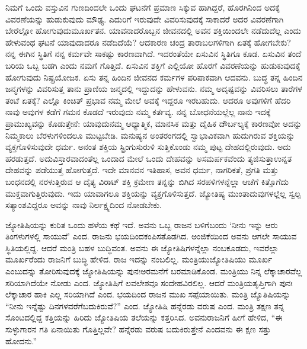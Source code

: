 \vskip 4pt

ನಿಮಗೆ ಒಂದು ವಸ್ತುವಿನ ಗುಣದಿಂದಲೇ ಒಂದು ಘಟನೆಗೆ ಪ್ರಮಾಣ ಸಿಕ್ಕುವ ಹಾಗಿದ್ದರೆ, ಹೊರಗಿನಿಂದ ಅದಕ್ಕೆ ವಿವರಣೆಯನ್ನು ಹುಡುಕುವುದು ಮೌಢ್ಯ. ಎದುರಿಗೆ ಇರುವುದೇ ವಿವರಿಸುವುದಕ್ಕೆ ಸಾಕಾದರೆ ಅದರ ವಿವರಣೆಗಾಗಿ ಬೇರೆಲ್ಲೋ ಹೋಗುವುದು\break ಮೂರ್ಖತನ. ಯಾವನಾದರೊಬ್ಬನ ಜೀವನದಲ್ಲಿ ಅವನ ಶಕ್ತಿಯಿಂದಲೇ ನಡೆದುದೆಲ್ಲ ಎಂದು ಹೇಳುವಂಥ ಘಟನೆ ಯಾವುದಾದರೂ ನಡೆದಿದೆಯೆ? ಆದಕಾರಣ ಚಂದ್ರ ತಾರಾಬಲಗಳಿಗಾಗಿ ಏತಕ್ಕೆ ಹೋಗಬೇಕು? ನನ್ನ ಈಗಿನ ಸ್ಥಿತಿಗೆ ನನ್ನ ಕರ್ಮವೇ ಸಾಕಷ್ಟು ಕಾರಣವಾಗಿದೆ. ಇದರಂತೆಯೇ ಏಸುವಿನ ಸ್ಥಿತಿಗೂ ಕೂಡ. ಏಸುವಿನ ತಂದೆ ಬರಿಯ ಒಬ್ಬ ಬಡಗಿ ಎಂದು ನಮಗೆ ಗೊತ್ತಿದೆ. ಏಸುವಿನ ಶಕ್ತಿಗೆ ಎಲ್ಲಿಯೋ ಹೊರಗೆ ವಿವರಣೆಯನ್ನು ಹುಡುಕುವುದಕ್ಕೆ ಹೋಗುವುದು ನಿಷ್ಪ್ರಯೋಜಕ. ಏಸು ತನ್ನ ಹಿಂದಿನ ಜೀವನದ ಕರ್ಮಗಳ ಪರಿಪಾಕವಾಗಿ ಆದವನು. ಬುದ್ಧ ತನ್ನ ಹಿಂದಿನ ಜನ್ಮಗಳನ್ನು ವಿವರಿಸುತ್ತ ತಾನು ಪ್ರಾಣಿಯ ಜನ್ಮದಲ್ಲಿ ಇದ್ದುದನ್ನು ಹೇಳುವನು. ನಮ್ಮ ಅದೃಷ್ಟವನ್ನು ವಿವರಿಸಲು ತಾರೆಗಳ ತಂಟೆ ಏತಕ್ಕೆ? ಎಲ್ಲೊ ಕಿಂಚಿತ್​ ಪ್ರಭಾವ ನಮ್ಮ ಮೇಲೆ ಅವಕ್ಕೆ ಇದ್ದರೂ ಇರಬಹುದು. ಆದರೂ ಅವುಗಳಿಗೆ ಹೆದರಿ ನಾವು ಅವುಗಳ ಕಡೆಗೆ ಗಮನ ಕೊಡದೆ ಇರುವುದು ನಮ್ಮ ಕರ್ತವ್ಯ. ನನ್ನ ಬೋಧನೆಯಲ್ಲೆಲ್ಲ ನಾನು ಇದಕ್ಕೆ ಪ್ರಾಮುಖ್ಯವನ್ನು ಕೊಡುತ್ತೇನೆ: ಯಾವುದು\break ನಮ್ಮ ಆಧ್ಯಾತ್ಮಿಕ, ಮಾನಸಿಕ ಮತ್ತು ದೈಹಿಕ ದೌರ್ಬಲ್ಯಕ್ಕೆ ಕಾರಣವೋ ಅದನ್ನು ನಿಮ್ಮ\break ಕಾಲು ಬೆರಳುಗಳಿಂದಲೂ ಮುಟ್ಟಬೇಡಿ. ಮನುಷ್ಯನ ಅಂತರಂಗದಲ್ಲಿ ಸ್ವಾಭಾವಿಕವಾಗಿ ಹುದುಗಿರುವ ಶಕ್ತಿಯನ್ನು ವ್ಯಕ್ತಗೊಳಿಸುವುದೇ ಧರ್ಮ. ಅನಂತ ಶಕ್ತಿಯ ಸ್ಪ್ರಿಂಗು\break ಸುರುಳಿ ಸುತ್ತಿಕೊಂಡು ನಮ್ಮ ಪುಟ್ಟ ದೇಹದಲ್ಲಿರುವುದು. ಅದು ಹರಡುತ್ತದೆ. ಅದು\break ವಿಸ್ತಾರವಾದಂತೆಲ್ಲ ಒಂದಾದ ಮೇಲೆ ಒಂದು ದೇಹವನ್ನು ಅಸಮರ್ಪಕವೆಂದು ತ್ಯಜಿಸುತ್ತಾ\break ಉನ್ನತ ದೇಹವನ್ನು ಪಡೆಯುತ್ತ ಹೋಗುತ್ತದೆ. ಇದೇ ಮಾನವನ ಇತಿಹಾಸ, ಅವನ ಧರ್ಮ, ನಾಗರಿಕತೆ, ಪ್ರಗತಿ ಮತ್ತು ಬಂಧನದಲ್ಲಿ ನರಳುತ್ತಿರುವ ಆ ದೈತ್ಯ ವಿರಾಟ್​ ಶಕ್ತಿ ಕ್ರಮೇಣ ತನ್ನನ್ನು ಬಿಗಿದ ಸರಪಳಿಗಳನ್ನೆಲ್ಲಾ ಆಚೆಗೆ ಕಿತ್ತೊಗೆದು ಮುಕ್ತವಾಗುತ್ತಿರುವುದು. ಇದು ಯಾವಾಗಲೂ ಶಕ್ತಿಯನ್ನು ವ್ಯಕ್ತಗೊಳಿಸುತ್ತದೆ. ಜ್ಯೋತಿಷ್ಯ ಮುಂತಾದುವುಗಳಲ್ಲೆಲ್ಲ ಸ್ವಲ್ಪ ಸತ್ಯಾಂಶವಿದ್ದರೂ ಅವನ್ನು ನಾವು ನಿರ್ಲಕ್ಷ್ಯದಿಂದ ನೋಡಬೇಕು.

\vskip 4pt

ಜ್ಯೋತಿಷಿಯನ್ನು ಕುರಿತ ಒಂದು ಹಳೆಯ ಕಥೆ ಇದೆ. ಅವನು ಒಬ್ಬ ರಾಜನ ಬಳಿಗೆ\break ಬಂದು ‘ನೀನು ಇನ್ನು ಆರು ತಿಂಗಳುಗಳಲ್ಲಿ ಸಾಯುವೆ’ ಎಂದ. ರಾಜನು ಭಯದಿಂದ\break ಕಂಪಿಸತೊಡಗಿದ. ಅಂಜಿಕೆಯಿಂದ ಅವನು ಆಗಲೇ ಸಾಯುವ ಸ್ಥಿತಿಯಲ್ಲಿದ್ದ. ಆದರೆ ಮಂತ್ರಿ ಬಹಳ ಬುದ್ಧಿವಂತ. ಅವನು ಈ ಜ್ಯೋತಿಷಿಗಳನ್ನೆಲ್ಲಾ ನಂಬಕೂಡದು, ಇವರೆಲ್ಲಾ ಮೂರ್ಖರೆಂದು ರಾಜನಿಗೆ ಬುದ್ಧಿ ಹೇಳಿದ. ರಾಜ ಇದನ್ನು ನಂಬಲಿಲ್ಲ. ಮಂತ್ರಿಯು\break ಜ್ಯೋತಿಷಿಯು ಮೂರ್ಖ ಎಂಬುದನ್ನು ತೋರಿಸುವುದಕ್ಕೆ ಜ್ಯೋತಿಷಿಯನ್ನು ಪುನಃ\break ಅರಮನೆಗೆ ಬರಮಾಡಿಕೊಂಡ. ಮಂತ್ರಿಯು ನಿನ್ನ ಲೆಕ್ಕಾಚಾರವೆಲ್ಲ ಸರಿಯಾಗಿದೆಯೇ ನೋಡು ಎಂದ. ಜ್ಯೋತಿಷಿಗೆ ಲವಲೇಶವೂ ಸಂದೇಹವಿರಲಿಲ್ಲ. ಆದರೆ ಮಂತ್ರಿಯ\break ತೃಪ್ತಿಗಾಗಿ ಪುನಃ ಲೆಕ್ಕಾಚಾರ ಹಾಕಿ ಎಲ್ಲ ಸರಿಯಾಗಿದೆ ಎಂದ. ಭಯದಿಂದ ರಾಜನ ಮುಖ ಸಪ್ಪೆಯಾಯಿತು. ಮಂತ್ರಿ ಜ್ಯೊತಿಷಿಯನ್ನು “ನೀನು ಇನ್ನೆಷ್ಟು ದಿನಗಳವರೆಗೆ\break ಬದುಕಿರುವೆ?” ಎಂದ. ಜ್ಯೋತಿಷಿ ಹನ್ನೆರಡು ವರುಷ ಎಂದ. ಮಂತ್ರಿ ತಕ್ಷಣ ತನ್ನ ಸೊಂಟದಲ್ಲಿದ್ದ ಕತ್ತಿಯನ್ನು ಹಿರಿದು ಜ್ಯೋತಿಷಿಯ ತಲೆಯನ್ನು ಕತ್ತರಿಸಿದ. ಅವನು\break ರಾಜನಿಗೆ ಹೀಗೆ ಹೇಳಿದ, “ಈ ಸುಳ್ಳುಗಾರನ ಗತಿ ಏನಾಯಿತು ಗೊತ್ತಿಲ್ಲವೇ? ಹನ್ನೆರಡು ವರುಷ ಬದುಕಿರುತ್ತೇನೆ ಎಂದವನು ಈ ಕ್ಷಣ ಸತ್ತು ಹೋದನು.”


